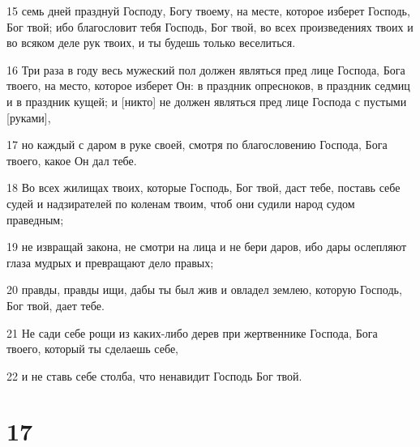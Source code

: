 \par 15 семь дней празднуй Господу, Богу твоему, на месте, которое изберет Господь, Бог твой; ибо благословит тебя Господь, Бог твой, во всех произведениях твоих и во всяком деле рук твоих, и ты будешь только веселиться.
\par 16 Три раза в году весь мужеский пол должен являться пред лице Господа, Бога твоего, на место, которое изберет Он: в праздник опресноков, в праздник седмиц и в праздник кущей; и [никто] не должен являться пред лице Господа с пустыми [руками],
\par 17 но каждый с даром в руке своей, смотря по благословению Господа, Бога твоего, какое Он дал тебе.
\par 18 Во всех жилищах твоих, которые Господь, Бог твой, даст тебе, поставь себе судей и надзирателей по коленам твоим, чтоб они судили народ судом праведным;
\par 19 не извращай закона, не смотри на лица и не бери даров, ибо дары ослепляют глаза мудрых и превращают дело правых;
\par 20 правды, правды ищи, дабы ты был жив и овладел землею, которую Господь, Бог твой, дает тебе.
\par 21 Не сади себе рощи из каких-либо дерев при жертвеннике Господа, Бога твоего, который ты сделаешь себе,
\par 22 и не ставь себе столба, что ненавидит Господь Бог твой.

\chapter{17}

